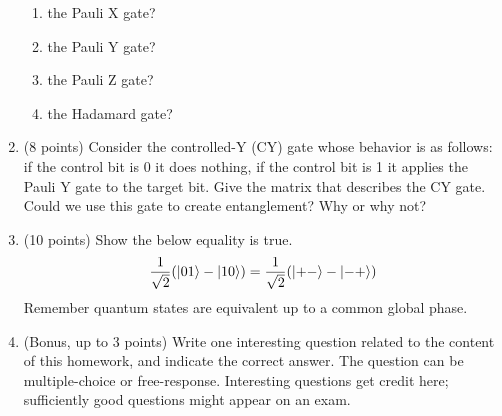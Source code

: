 \documentclass[12pt]{article}
\begin{document}
\begin{enumerate}[font=\bfseries]
        \begin{enumerate}
            \item the Pauli X gate?
            \item the Pauli Y gate?
            \item the Pauli Z gate?
            \item the Hadamard gate?
        \end{enumerate}
    \item (8 points) Consider the controlled-Y (CY) gate whose behavior is as follows: if the control bit is 0 it does nothing, if the control bit is 1 it applies the Pauli Y gate to the target bit. Give the matrix that describes the CY gate. Could we use this gate to create entanglement? Why or why not?
    \item (10 points) Show the below equality is true.
    \[\frac{1}{\sqrt{2}}(\ket{01} - \ket{10}) = \frac{1}{\sqrt{2}}(\ket{+-} - \ket{-+})\]
    Remember quantum states are equivalent up to a common global phase.
    \item (Bonus, up to 3 points) Write one interesting question related to the content of this homework, and indicate the correct answer. The question can be multiple-choice or free-response.  Interesting questions get credit here;  sufficiently good questions might appear on an exam.
\end{enumerate}
\end{document}
